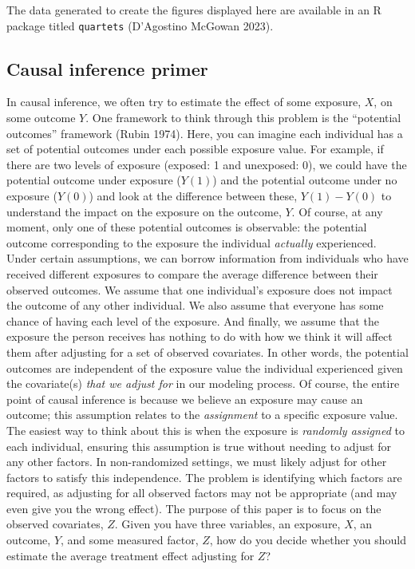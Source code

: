 \documentclass[
  letterpaper,
  DIV=11,
  numbers=noendperiod]{scrartcl}
\begin{document}
The data generated to create the figures displayed here are available in
an R package titled \texttt{quartets} (D'Agostino McGowan 2023).

\hypertarget{causal-inference-primer}{%
\subsection{Causal inference primer}\label{causal-inference-primer}}

In causal inference, we often try to estimate the effect of some
exposure, \(X\), on some outcome \(Y\). One framework to think through
this problem is the ``potential outcomes'' framework (Rubin 1974). Here,
you can imagine each individual has a set of potential outcomes under
each possible exposure value. For example, if there are two levels of
exposure (exposed: 1 and unexposed: 0), we could have the potential
outcome under exposure (\(Y(1)\)) and the potential outcome under no
exposure (\(Y(0)\)) and look at the difference between these,
\(Y(1) - Y(0)\) to understand the impact on the exposure on the outcome,
\(Y\). Of course, at any moment, only one of these potential outcomes is
observable: the potential outcome corresponding to the exposure the
individual \emph{actually} experienced. Under certain assumptions, we
can borrow information from individuals who have received different
exposures to compare the average difference between their observed
outcomes. We assume that one individual's exposure does not impact the
outcome of any other individual. We also assume that everyone has some
chance of having each level of the exposure. And finally, we assume that
the exposure the person receives has nothing to do with how we think it
will affect them after adjusting for a set of observed covariates. In
other words, the potential outcomes are independent of the exposure
value the individual experienced given the covariate(s) \emph{that we
adjust for} in our modeling process. Of course, the entire point of
causal inference is because we believe an exposure may cause an outcome;
this assumption relates to the \emph{assignment} to a specific exposure
value. The easiest way to think about this is when the exposure is
\emph{randomly assigned} to each individual, ensuring this assumption is
true without needing to adjust for any other factors. In non-randomized
settings, we must likely adjust for other factors to satisfy this
independence. The problem is identifying which factors are required, as
adjusting for all observed factors may not be appropriate (and may even
give you the wrong effect). The purpose of this paper is to focus on the
observed covariates, \(Z\). Given you have three variables, an exposure,
\(X\), an outcome, \(Y\), and some measured factor, \(Z\), how do you
decide whether you should estimate the average treatment effect
adjusting for \(Z\)?
\end{document}
